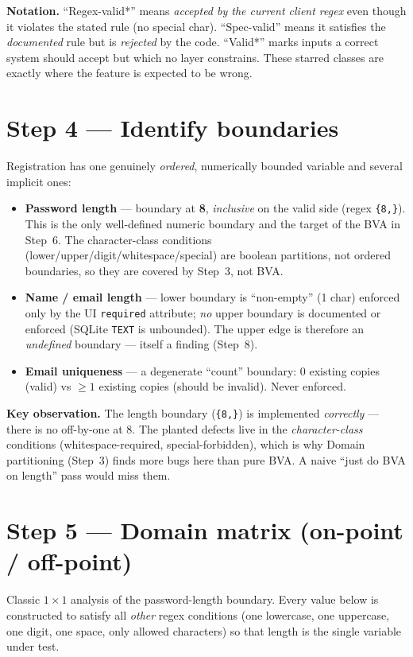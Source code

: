 \documentclass[11pt,a4paper]{article}
\begin{document}
\noindent\textbf{Notation.} ``Regex-valid*'' means \emph{accepted by the current client
regex} even though it violates the stated rule (no special char). ``Spec-valid'' means it
satisfies the \emph{documented} rule but is \emph{rejected} by the code. ``Valid*'' marks
inputs a correct system should accept but which no layer constrains. These starred classes
are exactly where the feature is expected to be wrong.

\section{Step 4 --- Identify boundaries}
\label{sec:bounds}
Registration has one genuinely \emph{ordered}, numerically bounded variable and several
implicit ones:

\begin{itemize}[leftmargin=*]
  \item \textbf{Password length} --- boundary at \textbf{8}, \emph{inclusive} on the valid
  side (regex \verb|{8,}|). This is the only well-defined numeric boundary and the target of
  the BVA in Step~6. The character-class conditions (lower/upper/digit/whitespace/special)
  are boolean partitions, not ordered boundaries, so they are covered by Step~3, not BVA.
  \item \textbf{Name / email length} --- lower boundary is ``non-empty'' (1 char) enforced
  only by the UI \texttt{required} attribute; \emph{no} upper boundary is documented or
  enforced (SQLite \texttt{TEXT} is unbounded). The upper edge is therefore an
  \emph{undefined} boundary --- itself a finding (Step~8).
  \item \textbf{Email uniqueness} --- a degenerate ``count'' boundary: 0 existing copies
  (valid) vs $\ge 1$ existing copies (should be invalid). Never enforced.
\end{itemize}

\noindent\textbf{Key observation.} The length boundary (\verb|{8,}|) is implemented
\emph{correctly} --- there is no off-by-one at 8. The planted defects live in the
\emph{character-class} conditions (whitespace-required, special-forbidden), which is why
Domain partitioning (Step~3) finds more bugs here than pure BVA. A naive ``just do BVA on
length'' pass would miss them.

\section{Step 5 --- Domain matrix (on-point / off-point)}
\label{sec:matrix}
Classic $1\times1$ analysis of the password-length boundary. Every value below is
constructed to satisfy all \emph{other} regex conditions (one lowercase, one uppercase, one
digit, one space, only allowed characters) so that length is the single variable under test.
\end{document}
